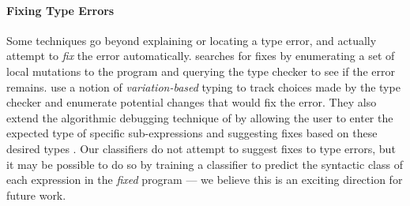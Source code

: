 %


\paragraph{Fixing Type Errors}
Some techniques go beyond explaining or locating a type error,
and actually attempt to \emph{fix} the error automatically.
%
\citet{Lerner2007-dt} searches for fixes by enumerating a
set of local mutations to the program and querying the type checker to
see if the error remains.
%
\citet{Chen2014-gd} use a notion of \emph{variation-based} typing to
track choices made by the type checker and enumerate potential
changes that would fix the error.
%
They also extend the algorithmic debugging technique of
\citeauthor{Chitil2001-td} by allowing the user to enter the expected
type of specific sub-expressions and suggesting fixes based on these
desired types \citeyear{Chen2014-vm}.
%
Our classifiers do not attempt to suggest fixes to type errors, but it
may be possible to do so by training a classifier to predict the
syntactic class of each expression in the \emph{fixed} program --- we
believe this is an exciting direction for future work.

